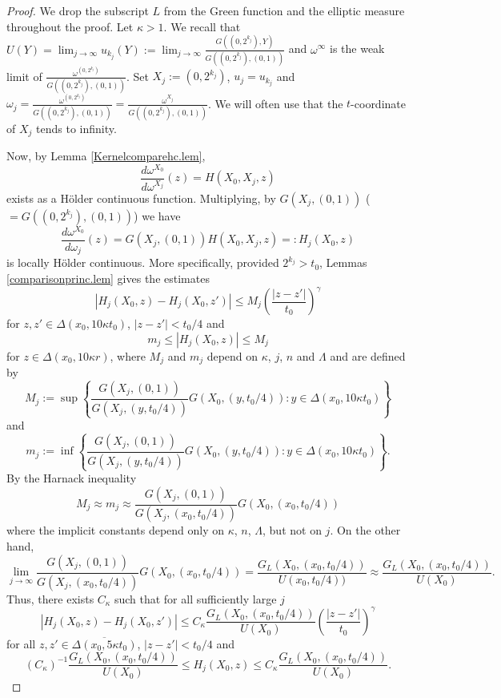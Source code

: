 \documentclass[11pt, a4paper,leqno]{amsart}
\theoremstyle{plain}
\theoremstyle{definition}
\theoremstyle{remark}
\numberwithin{equation}{section}
\newcommand{\hm}{\omega}
\begin{document}
\begin{proof}
We drop the subscript $L$ from the Green function and the elliptic measure throughout the proof. Let $\kappa > 1$. We recall that $U(Y) = \lim_{j \to \infty} u_{k_j}(Y) :=\lim_{j \to \infty} \frac{G((0,2^{k_j}), Y)}{G((0,2^{k_j}), (0,1))}$ and $\hm^\infty$ is the weak limit of $\frac{\hm^{(0,2^{k_j})}}{G((0,2^{k_j}), (0,1))}$. Set $X_j := (0,2^{k_j})$, $u_j = u_{k_j}$ and $\hm_j = \frac{\hm^{(0,2^{k_j})}}{G((0,2^{k_j}), (0,1))} = \frac{\hm^{X_j}}{G((0,2^{k_j}), (0,1))} $. We will often use that the $t$-coordinate of $X_j$ tends to infinity. 

Now, by Lemma \ref{Kernelcomparehc.lem},
\[\frac{d\hm^{X_0}}{d\hm^{X_j}}(z) = H(X_0,X_j, z)\]
exists as a H\"older continuous function. Multiplying, by $G(X_j, (0,1))$  ($=G((0,2^{k_j}), (0,1))$) we have 
\[\frac{d\hm^{X_0}}{d\hm_j}(z) = G(X_j, (0,1))H(X_0,X_j, z) =: H_j(X_0,z)\]
is locally H\"older continuous. More specifically, provided $2^{k_j} > t_0$, Lemmas \ref{comparisonprinc.lem} gives the estimates
\[ |H_j(X_0,z) - H_j(X_0,z')| \le M_j\left(\frac{|z - z'|}{t_0} \right)^\gamma \]
for $z, z' \in \Delta(x_0, 10\kappa t_0)$, $|z - z'| < t_0/4$
and 
\[m_j \le |H_j(X_0,z)| \le M_j\]
for $z \in \Delta(x_0, 10\kappa r)$,
where $M_j$ and $m_j$ depend on $\kappa$, $j$, $n$ and $\Lambda$ and are defined by
\[M_j := \sup\left\{ \frac{G(X_j, (0,1))}{G(X_j, (y,t_0/4))} G(X_0, (y,t_0/4)): y \in \Delta(x_0, 10\kappa t_0)\right \} \]
and 
\[m_j := \inf\left\{ \frac{G(X_j, (0,1))}{G(X_j, (y,t_0/4))} G(X_0, (y,t_0/4)): y \in \Delta(x_0, 10\kappa t_0) \right\}.\]
By the Harnack inequality 
\[M_j  \approx m_j \approx  \frac{G(X_j, (0,1))}{G(X_j, (x_0,t_0/4))} G(X_0, (x_0,t_0/4))  \]
where the implicit constants depend only on $\kappa$, $n$, $\Lambda$, but not on $j$. On the other hand,
\[\lim_{j \to \infty} \frac{G(X_j, (0,1))}{G(X_j, (x_0,t_0/4))} G(X_0, (x_0,t_0/4))  = \frac{G_L(X_0, (x_0, t_0/4))}{U(x_0,t_0/4))} \approx   \frac{G_L(X_0, (x_0, t_0/4))}{U(X_0)}.\]
Thus, there exists $C_\kappa$ such that for all sufficiently large $j$
\begin{equation}\label{HCinfkernj.eq}
|H_j(X_0, z) - H_j(X_0, z')| \le C_\kappa \frac{G_L(X_0, (x_0, t_0/4))}{U(X_0)} \left(\frac{|z - z'|}{t_0}\right)^\gamma 
\end{equation}
for all $z,z' \in \overline{\Delta(x_0, 5\kappa t_0)}$, $|z - z'| < t_0/4$ and
\begin{equation}\label{compinfkernj.eq}
 (C_\kappa)^{-1} \frac{G_L(X_0, (x_0, t_0/4))}{U(X_0)} \le H_j(X_0, z) \le C_\kappa \frac{G_L(X_0, (x_0, t_0/4))}{U(X_0)}.

\end{equation}
\end{proof}
\end{document}
